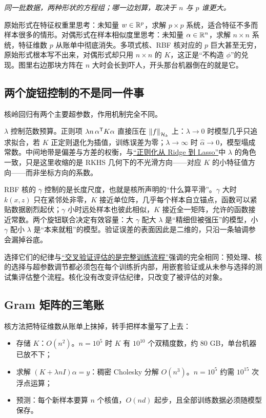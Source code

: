 \emph{同一批数据，两种形状的方程组；哪一边划算，取决于 \(n\) 与 \(p\) 谁更大。}

原始形式在特征权重里思考：未知量 \(w\in\mathbb{R}^{p}\)，求解 \(p\times p\) 系统，适合特征不多而样本很多的情形。对偶形式在样本相似度里思考：未知量 \(\alpha\in\mathbb{R}^{n}\)，求解 \(n\times n\) 系统，特征维数 \(p\) 从账单中彻底消失。多项式核、RBF 核对应的 \(p\) 巨大甚至无穷，原始形式根本写不出来，对偶形式却只用 \(n\times n\) 的 \(K\)，这正是``不构造 \(\phi\)''的兑现。图里右边那块方阵在 \(n\) 大时会长到吓人，开头那台机器倒在的就是它。

\subsection{两个旋钮控制的不是同一件事}

核岭回归有两个主要超参数，作用机制完全不同。

\(\lambda\) 控制范数预算。正则项 \(\lambda n\,\alpha^{\mathsf{T}}K\alpha\) 直接压在 \(\left\lVert f\right\rVert_{\mathcal{H}_k}\) 上：\(\lambda\to0\) 时模型几乎只追求拟合，若 \(K\) 正定则退化为插值，训练误差为零；\(\lambda\to\infty\) 时 \(\widehat\alpha\to0\)，模型塌成常数。中间地带是偏差与方差的权衡，与\hyperref[sec:13-Machine-Learning/02-Linear-Models/02]{``正则化从 Ridge 到 Lasso''}中 \(\lambda\) 的角色一致，只是这里收缩的是 RKHS 几何下的不光滑方向——对应 \(K\) 的小特征值方向——而非坐标方向的系数。

RBF 核的 \(\gamma\) 控制的是长度尺度，也就是核所声明的``什么算平滑''。\(\gamma\) 大时 \(k(x,z)\) 只在紧邻处非零，\(K\) 接近单位阵，几乎每个样本自立锚点，函数可以紧贴数据剧烈起伏；\(\gamma\) 小时远处样本也彼此相似，\(K\) 接近全一矩阵，允许的函数接近常数。两个旋钮联合决定有效容量：大 \(\gamma\) 配大 \(\lambda\) 是``精细但被强压''的模型，小 \(\gamma\) 配小 \(\lambda\) 是``本来就粗''的模型。验证误差的表面因此是二维的，只沿一条轴调参会漏掉谷底。

选择它们的纪律与\hyperref[sec:11-Mathematical-Statistics/06-Resampling-and-Model-Selection/03]{``交叉验证评估的是完整训练流程''}强调的完全相同：预处理、核的选择与超参数调节都必须包在每个训练折内部，用嵌套验证或从未参与选择的测试集评估整个流程。核化没有改变评估纪律，只改变了被评估的对象。

\subsection{Gram 矩阵的三笔账}

核方法把特征维数从账单上抹掉，转手把样本量写了上去：

\begin{itemize}
\tightlist
\item
  存储 \(K\)：\(O(n^{2})\)。\(n=10^{5}\) 时 \(K\) 有 \(10^{10}\) 个双精度数，约 80 GB，单台机器已放不下；
\item
  求解 \((K+\lambda nI)\alpha=y\)：稠密 Cholesky 分解 \(O(n^{3})\)。\(n=10^{5}\) 约需 \(10^{15}\) 次浮点运算；
\item
  预测：每个新样本要算 \(n\) 个核值，\(O(nd)\) 起步，且全部训练数据必须随模型保存。
\end{itemize}


